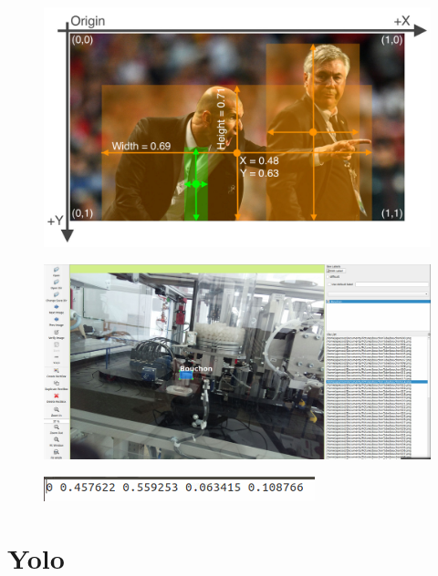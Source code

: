 \documentclass[12pt]{beamer}
\begin{document}
	\begin{frame}[allowframebreaks]
	    \begin{figure}
		    \centering
		    \includegraphics[width=1\linewidth]{image/exempleImgYolo.png}
	    \end{figure}
	    
	    \begin{figure}
		    \centering
		    \includegraphics[width=1\linewidth]{image/labelImg.png}
	    \end{figure}
	    
	    \begin{figure}
		    \centering
		    \includegraphics[width=1\linewidth]{image/labelTxt.png}
	    \end{figure}
	\end{frame}
	\section{Yolo}
\end{document}
